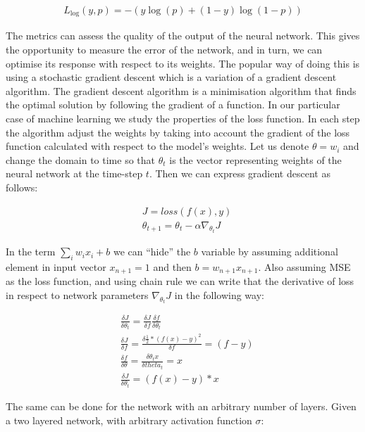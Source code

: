 \begin{align}
 L_{\log}(y, p) = -(y \log (p) + (1 - y) \log (1 - p))
\label{eq:logloss}
\end{align}

The metrics can assess the quality of the output of the neural network.
This gives the opportunity to measure the error of the network, and in turn, we can optimise its response with respect to its weights.
The popular way of doing this is using a stochastic gradient descent which is a variation of a gradient descent algorithm.
The gradient descent algorithm is a minimisation algorithm that finds the optimal solution by following the gradient of a function. In our particular case of machine learning we study the properties of the loss function.
In each step the algorithm adjust the weights by taking into account the gradient of the loss function calculated with respect to the model's weights.
Let us denote $\theta = w_{i}$ and change the domain to time so that $\theta_{t}$ is the vector representing weights of the neural network at the time-step $t$.
Then we can express gradient descent as follows:

\begin{align}
& J = loss(f(x), y) \\
& \theta_{t+1} = \theta_{t} - \alpha \nabla_{\theta_{t}}J
\end{align}

In the term $\sum_{i} w_{i}x_{i} + b$ we can ``hide'' the $b$ variable by assuming additional element in input vector $x_{n+1} = 1$ and then $b=w_{n+1}x_{n+1}$.
Also assuming MSE as the loss function, and using chain rule we can write that the derivative of loss in respect to network parameters $\nabla_{\theta_{t}}J$ in the following way:

\begin{align}
& \frac{\delta J}{\delta \theta_{t}} = \frac{\delta J}{\delta f }\frac{\delta f}{\delta \theta_{t}} \\
& \frac{\delta J}{\delta f } = \frac{\delta \frac{1}{2}*(f(x)-y)^{2}}{\delta f} = (f - y) \\
& \frac{\delta f}{\delta \theta } = \frac{\delta \theta_{t}x}{\delta theta_{t}} = x \\
& \frac{\delta J}{\delta \theta_{t}} = (f(x)-y)*x 
\end{align}

The same can be done for the network with an arbitrary number of layers. Given a two layered network, with arbitrary activation function $\sigma$:

